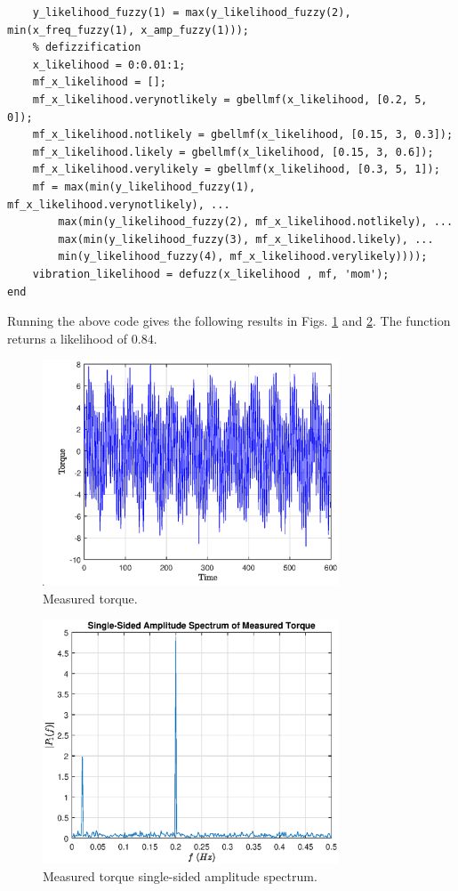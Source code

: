 \begin{lstlisting}
	y_likelihood_fuzzy(1) = max(y_likelihood_fuzzy(2), min(x_freq_fuzzy(1), x_amp_fuzzy(1)));
	% defizzification
	x_likelihood = 0:0.01:1;
	mf_x_likelihood = [];
	mf_x_likelihood.verynotlikely = gbellmf(x_likelihood, [0.2, 5, 0]);
	mf_x_likelihood.notlikely = gbellmf(x_likelihood, [0.15, 3, 0.3]);
	mf_x_likelihood.likely = gbellmf(x_likelihood, [0.15, 3, 0.6]);
	mf_x_likelihood.verylikely = gbellmf(x_likelihood, [0.3, 5, 1]);
	mf = max(min(y_likelihood_fuzzy(1), mf_x_likelihood.verynotlikely), ...
		max(min(y_likelihood_fuzzy(2), mf_x_likelihood.notlikely), ...
		max(min(y_likelihood_fuzzy(3), mf_x_likelihood.likely), ...
		min(y_likelihood_fuzzy(4), mf_x_likelihood.verylikely))));
	vibration_likelihood = defuzz(x_likelihood , mf, 'mom');
end
\end{lstlisting}

Running the above code gives the following results in Figs. \ref{ch:fcs:fig:exp_vibration_detection_signal} and \ref{ch:fcs:fig:exp_vibration_detection_signal_fft}. The function returns a likelihood of $0.84$. 

\begin{figure}
	\centering
	\includegraphics[width=250pt]{chapters/ch-fuzzy-control-system/figures/exp_vibration_detection_signal.eps}
	\caption{Measured torque.}
	\label{ch:fcs:fig:exp_vibration_detection_signal}
\end{figure}

\begin{figure}
	\centering
	\includegraphics[width=250pt]{chapters/ch-fuzzy-control-system/figures/exp_vibration_detection_signal_fft.eps}
	\caption{Measured torque single-sided amplitude spectrum.}
	\label{ch:fcs:fig:exp_vibration_detection_signal_fft}
\end{figure}

